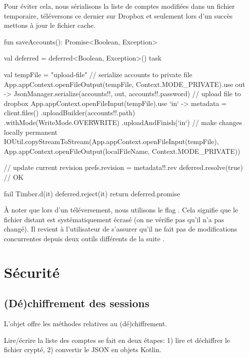 Pour éviter cela, nous sérialisons la liste de comptes modifiées dans un fichier temporaire, téléversons ce dernier sur Dropbox et seulement lors d'un succès mettons à jour le fichier cache.

\begin{kotlincode}
fun saveAccounts(): Promise<Boolean, Exception> {
    val deferred = deferred<Boolean, Exception>()
    task {
        val tempFile = "upload-file"
        // serialize accounts to private file
        App.appContext.openFileOutput(tempFile, Context.MODE_PRIVATE).use { out ->
            JsonManager.serialize(accounts!!, out, accounts!!.password)
        }
        // upload file to dropbox
        App.appContext.openFileInput(tempFile).use { `in` ->
            metadata = client.files()
                    .uploadBuilder(accounts!!.path)
                    .withMode(WriteMode.OVERWRITE)
                    .uploadAndFinish(`in`)
        }
        // make changes locally permanent
        IOUtil.copyStreamToStream(App.appContext.openFileInput(tempFile),
                App.appContext.openFileOutput(localFileName, Context.MODE_PRIVATE))

        // update current revision
        prefs.revision = metadata!!.rev
        deferred.resolve(true) // OK
    } fail {
        Timber.d(it)
        deferred.reject(it)
    }
    return deferred.promise
}
\end{kotlincode}

À noter que lors d'un téléversement, nous utilisons le flag . Cela signifie que le fichier distant est systématiquement écrasé (on ne vérifie pas qu'il n'a pas changé). Il revient à l'utilisateur de s'assurer qu'il ne fait pas de modifications concurrentes depuis deux outils différents de la suite \easypass.

\section{Sécurité}

\subsection{(Dé)chiffrement des sessions}

L'objet  offre les méthodes relatives au (dé)chiffrement.

Lire/écrire la liste des comptes se fait en deux étapes: 1) lire et déchiffrer le fichier crypté, 2) convertir le JSON en objets Kotlin.

